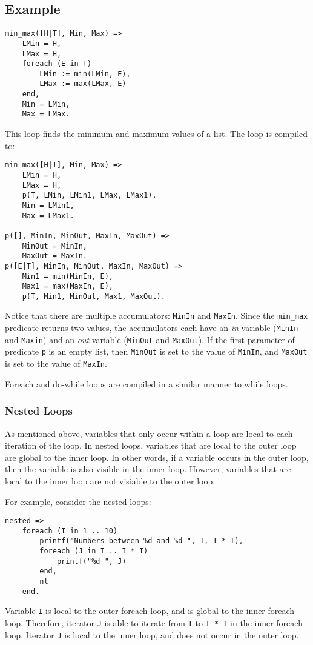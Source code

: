 \subsection*{Example}
\begin{verbatim}
min_max([H|T], Min, Max) =>
    LMin = H,
    LMax = H,
    foreach (E in T)
        LMin := min(LMin, E),
        LMax := max(LMax, E)
    end,
    Min = LMin,
    Max = LMax.
\end{verbatim}

This loop finds the minimum and maximum values of a list.  The loop is compiled to:
\begin{verbatim}
min_max([H|T], Min, Max) =>
    LMin = H,
    LMax = H,
    p(T, LMin, LMin1, LMax, LMax1),
    Min = LMin1,
    Max = LMax1.

p([], MinIn, MinOut, MaxIn, MaxOut) =>
    MinOut = MinIn,
    MaxOut = MaxIn.
p([E|T], MinIn, MinOut, MaxIn, MaxOut) =>
    Min1 = min(MinIn, E),
    Max1 = max(MaxIn, E),
    p(T, Min1, MinOut, Max1, MaxOut).
\end{verbatim}
Notice that there are multiple accumulators: \texttt{MinIn} and \texttt{MaxIn}.  Since the \texttt{min\_max} predicate returns two values, the accumulators each have an \textit{in} variable (\texttt{MinIn} and \texttt{Maxin}) and an \textit{out} variable (\texttt{MinOut} and \texttt{MaxOut}).   If the first parameter of predicate \texttt{p} is an empty list, then \texttt{MinOut} is set to the value of \texttt{MinIn}, and \texttt{MaxOut} is set to the value of \texttt{MaxIn}.

Foreach and do-while loops are compiled in a similar manner to while loops.

\subsubsection{Nested Loops}
As mentioned above, variables that only occur within a loop are local to each iteration of the loop.  In nested loops, variables that are local to the outer loop are global to the inner loop.  In other words, if a variable occurs in the outer loop, then the variable is also visible in the inner loop.  However, variables that are local to the inner loop are not visiable to the outer loop.

For example, consider the nested loops:
\begin{verbatim}
nested =>
    foreach (I in 1 .. 10)
        printf("Numbers between %d and %d ", I, I * I),
        foreach (J in I .. I * I)
            printf("%d ", J)
        end,
        nl
    end.
\end{verbatim}
Variable \texttt{I} is local to the outer foreach loop, and is global to the inner foreach loop.  Therefore, iterator \texttt{J} is able to iterate from \texttt{I} to \texttt{I * I} in the inner foreach loop.  Iterator \texttt{J} is local to the inner loop, and does not occur in the outer loop.

